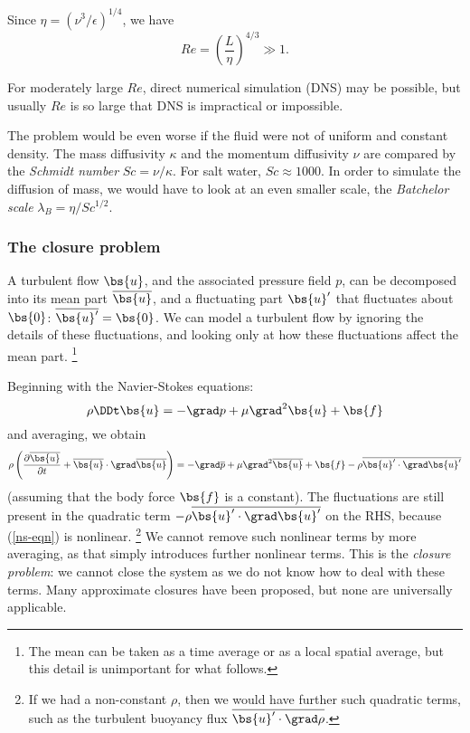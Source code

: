 Since $\eta = (\nu^3/\epsilon)^{1/4}$, we have
\begin{equation}
    Re = \left(\frac{L}{\eta}\right)^{4/3} \gg 1.
\end{equation}

For moderately large $Re$, direct numerical simulation (DNS) may be possible,
but usually $Re$ is so large that DNS is impractical or impossible. 

The problem would be even worse if the fluid were not of uniform and constant
density. The mass diffusivity $\kappa$ and the momentum diffusivity $\nu$ are
compared by the \textit{Schmidt number} $Sc = \nu/\kappa$. For salt water, $Sc
\approx 1000$. In order to simulate the diffusion of mass, we would have to look
at an even smaller scale, the \textit{Batchelor scale}
$\lambda_B=\eta/Sc^{1/2}$. 

\subsubsection{The closure problem}

A turbulent flow $\bs{u}$, and the associated pressure field $p$, can be
decomposed into its mean part $\overline{\bs{u}}$, and a fluctuating part $\bs{u}'$
that fluctuates about $\bs{0}$: $\overline{\bs{u}'} = \bs{0}$. We can model a
turbulent flow by ignoring the details of these fluctuations, and looking only
at how these fluctuations affect the mean part.
\footnote{The mean can be taken as a time average or as a local spatial average,
but this detail is unimportant for what follows.}

Beginning with the Navier-Stokes equations:
\begin{equation}
    \rho\DDt\bs{u} = -\grad p + \mu\grad^2\bs{u} + \bs{f}
    \label{ns-eqn}
\end{equation}
and averaging, we obtain
\begin{equation}
    \rho\left(\frac{\partial\overline{\bs{u}}}{\partial t} + \overline{\bs{u}}\cdot\grad\overline{\bs{u}}\right)
    = -\grad\overline{p} + \mu\grad^2\overline{\bs{u}} + \bs{f} - \rho\overline{\bs{u}'\cdot\grad\bs{u}'}
    \label{ave-ns-eqn}
\end{equation}
(assuming that the body force $\bs{f}$ is a constant). The fluctuations are
still present in the quadratic term $-\rho\overline{\bs{u}'\cdot\grad\bs{u}'}$ on the RHS,
because (\ref{ns-eqn}) is nonlinear.
\footnote{If we had a non-constant $\rho$, then we would have further such
quadratic terms, such as the turbulent buoyancy flux $\overline{\bs{u}'\cdot\grad\rho}$.}
We cannot remove such nonlinear terms by more averaging, as that simply
introduces further nonlinear terms. This is the \textit{closure problem}: we
cannot close the system as we do not know how to deal with these terms.
Many approximate closures have been proposed, but none are universally
applicable.

